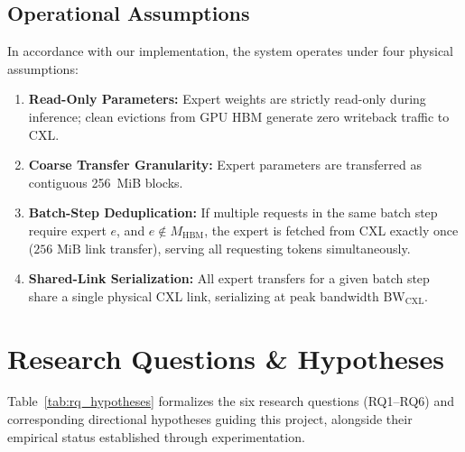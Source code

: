 \documentclass[10pt,journal,compsoc]{IEEEtran}
\begin{document}
\subsection{Operational Assumptions}
In accordance with our implementation, the system operates under four physical assumptions:
\begin{enumerate}
    \item \textbf{Read-Only Parameters:} Expert weights are strictly read-only during inference; clean evictions from GPU HBM generate zero writeback traffic to CXL.
    \item \textbf{Coarse Transfer Granularity:} Expert parameters are transferred as contiguous 256~MiB blocks.
    \item \textbf{Batch-Step Deduplication:} If multiple requests in the same batch step require expert $e$, and $e \notin M_{\text{HBM}}$, the expert is fetched from CXL exactly once ($256\text{ MiB}$ link transfer), serving all requesting tokens simultaneously.
    \item \textbf{Shared-Link Serialization:} All expert transfers for a given batch step share a single physical CXL link, serializing at peak bandwidth $\text{BW}_{\text{CXL}}$.
\end{enumerate}

\section{Research Questions \& Hypotheses}
\label{sec:rqs}

Table~\ref{tab:rq_hypotheses} formalizes the six research questions (RQ1--RQ6) and corresponding directional hypotheses guiding this project, alongside their empirical status established through experimentation.
\end{document}
